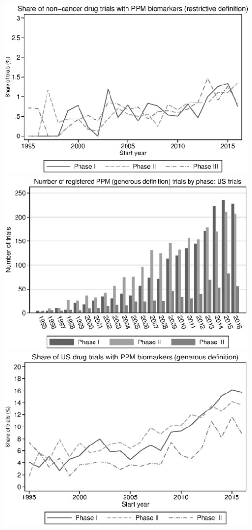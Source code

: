 \includegraphics{../figures/06d-r_ppm_share_by_phase_noncancer.eps}
\includegraphics{../figures/07a-g_ppm_count_by_phase_us.eps}
\includegraphics{../figures/07b-g_ppm_share_by_phase_us.eps}
